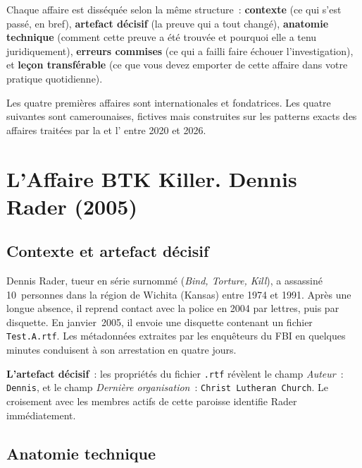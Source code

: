 Chaque affaire est disséquée selon la même structure~: \textbf{contexte} (ce
qui s'est passé, en bref), \textbf{artefact décisif} (la preuve qui a tout
changé), \textbf{anatomie technique} (comment cette preuve a été trouvée et
pourquoi elle a tenu juridiquement), \textbf{erreurs commises} (ce qui a failli
faire échouer l'investigation), et \textbf{leçon transférable} (ce que vous
devez emporter de cette affaire dans votre pratique quotidienne).

\medskip

Les quatre premières affaires sont internationales et fondatrices. Les quatre
suivantes sont camerounaises, fictives mais construites sur les patterns
exacts des affaires traitées par la  et l' entre
2020 et 2026.

\separateur

\section{L'Affaire BTK Killer. Dennis Rader (2005)}
\label{sec:btk}

\subsection{Contexte et artefact décisif}

Dennis Rader, tueur en série surnommé  (\textit{Bind, Torture,
Kill}), a assassiné 10~personnes dans la région de Wichita (Kansas) entre
1974 et 1991. Après une longue absence, il reprend contact avec la police en
2004 par lettres, puis par disquette. En janvier~2005, il envoie une disquette
contenant un fichier \texttt{Test.A.rtf}. Les métadonnées extraites par les
enquêteurs du FBI en quelques minutes conduisent à son arrestation en
quatre jours.

\medskip

\textbf{L'artefact décisif}~: les propriétés du fichier \texttt{.rtf} révèlent
le champ \textit{Auteur}~: \texttt{Dennis}, et le champ
\textit{Dernière organisation}~: \texttt{Christ Lutheran Church}. Le
croisement avec les membres actifs de cette paroisse identifie Rader
immédiatement.

\subsection{Anatomie technique}

